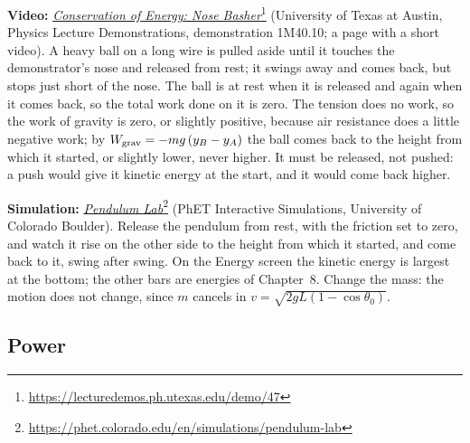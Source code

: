 \documentclass[11pt,a4paper]{article}
\begin{document}
\begin{aside}
\textbf{Video:}
\href{https://lecturedemos.ph.utexas.edu/demo/47}{\emph{Conservation of Energy: Nose
Basher}}\footnote{\url{https://lecturedemos.ph.utexas.edu/demo/47}} (University of Texas at
Austin, Physics Lecture Demonstrations, demonstration 1M40.10; a page with a short video). A heavy
ball on a long wire is pulled aside until it touches the demonstrator's nose and released from
rest; it swings away and comes back, but stops just short of the nose. The ball is at rest when it
is released and again when it comes back, so the total work done on it is zero. The tension does no
work, so the work of gravity is zero, or slightly positive, because air resistance does a little
negative work; by $W_{\mathrm{grav}} = -mg\,(y_B - y_A)$ the ball comes back to the height from which it
started, or slightly lower, never higher. It must be released, not pushed: a push would give it
kinetic energy at the start, and it would come back higher.
\par\smallskip
\textbf{Simulation:}
\href{https://phet.colorado.edu/en/simulations/pendulum-lab}{\emph{Pendulum
Lab}}\footnote{\url{https://phet.colorado.edu/en/simulations/pendulum-lab}} (PhET Interactive
Simulations, University of Colorado Boulder). Release the pendulum from rest, with the friction set
to zero, and watch it rise on the other side to the height from which it started, and come back to
it, swing after swing. On the Energy screen the kinetic energy is largest at the bottom; the other
bars are energies of Chapter~8. Change the mass: the motion does not change, since $m$ cancels in
$v = \sqrt{2gL(1 - \cos\theta_0)}$.
\end{aside}

\subsection{Power}\label{sec:power}
\end{document}

